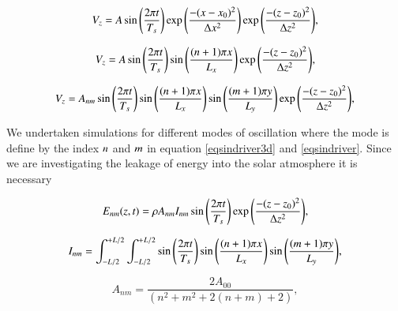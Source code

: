 \documentclass{aa}
\begin{document}
\begin{equation}\label{eqpointdriver}
V_{z}=A \sin{\left({2\pi t}\over{T_s} \right)  }  \exp{\left( -{(x-x_0)^{2}}\over{\Delta x^{2}} \right) } \exp{\left( -{(z-z_0)^{2}}\over{\Delta z^{2}} \right) },
\end{equation}


\begin{equation}\label{eqsindriver}
V_{z}=A \sin{\left({2\pi t}\over{T_s} \right)  }\sin{\left(  {(n+1)\pi x}\over{L_x} \right)} \exp{\left( -{(z-z_0)^{2}}\over{\Delta z^{2}} \right) },
\end{equation}


\begin{equation}\label{eqsindriver3d}
V_{z}=A_{nm} \sin{\left({2\pi t}\over{T_s} \right)  }\sin{\left(  {(n+1)\pi x}\over{L_x} \right)}   \sin{\left(  {(m+1)\pi y}\over{L_y} \right)}    \exp{\left( -{(z-z_0)^{2}}\over{\Delta z^{2}} \right) },
\end{equation}


We undertaken simulations for different modes of oscillation where the mode is define by the index $\it{n}$ and $\it{m}$ in equation \eqref{eqsindriver3d} and \eqref{eqsindriver}. Since we are investigating the leakage of energy into the solar atmosphere it is necessary 

\begin{equation}\label{driverenergy}
E_{nm}(z,t)= \rho A_{nm} I_{nm}  \sin{\left({2\pi t}\over{T_s} \right)  }    \exp{\left( -{(z-z_0)^{2}}\over{\Delta z^{2}} \right) },
\end{equation}

\begin{equation}\label{driverenergyintegral}
I_{nm}=  \int_{-L/2}^{+L/2} \int_{-L/2}^{+L/2} \sin{\left({2\pi t}\over{T_s} \right)  }\sin{\left(  {(n+1)\pi x}\over{L_x} \right)}   \sin{\left(  {(m+1)\pi y}\over{L_y} \right)}   ,
\end{equation}

\begin{equation}\label{driveramplituderelatinl}
A_{nm}=\frac{2A_{00}}{(n^2+m^2+2(n+m)+2)}   ,
\end{equation}


\end{document}
